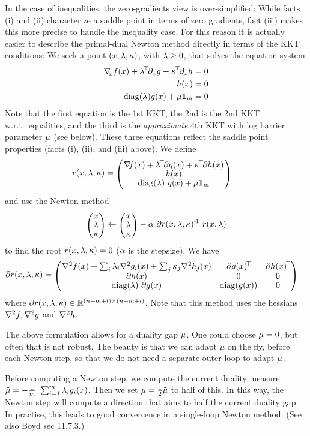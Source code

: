 In the case of inequalities, the zero-gradients view is over-simplified: While facts (i) and (ii) characterize a saddle point
in terms of zero gradients, fact (iii) makes this more precise to
handle the inequality case. For this reason it is actually easier to
describe the primal-dual Newton method directly in terms of the KKT
conditions: We seek a point $(x,\lambda,\kappa)$, with $\lambda\ge0$, that solves the equation system
\begin{align}
  {\nabla_{\!\!}}_x f(x) + \lambda^{\!\top\!} \partial_x g + \kappa^{\!\top\!} \partial_x h &= 0 \\
  h(x) &= 0 \\
  {\rm diag}(\lambda) g(x) + \mu {{\bf 1}}_m &=0
\end{align}
Note that the first equation is the 1st KKT, the 2nd is the 2nd KKT w.r.t.\ equalities, and the third is
the \emph{approximate} 4th KKT with log barrier parameter $\mu$ (see below). These
three equations reflect the saddle point properties (facts (i), (ii),
and (iii) above). We define
\begin{align}
r(x,\l,\k)
&= \mat{c}{
  \na f(x) + \l^\T \del g(x) + \k^\T \del h(x) \\
  h(x) \\
  \diag(\l)~ g(x) + \m \one_m}
\end{align}
and use the Newton method
\begin{equation}
\mat{c}{x\\\l\\\k}
 \gets \mat{c}{x\\\l\\\k} - \a~ \del r(x,\l,\k)^\1~ r(x,\l)
\end{equation}
to find the root $r(x,\lambda,\kappa)=0$ ($\alpha$ is the stepsize). We have
\begin{align}
\del r(x,\l,\k)
 &= \mat{ccc}{
  \he f(x) + \Sum_i \l_i \he g_i(x) + \Sum_j \k_j \he h_j(x) & \del g(x)^\T & \del h(x)^\T \\
  \del h(x) & 0 & 0 \\
  \diag(\l)~ \del g(x) & \diag(g(x)) & 0 
}
\end{align}
where $\partial r(x,\lambda,\kappa) \in {\mathbb{R}}^{(n+m+l)\times(n+m+l)}$.
Note that this method uses the hessians ${\nabla_{\!\!}^2} f, {\nabla_{\!\!}^2} g$ and ${\nabla_{\!\!}^2} h$.

The above formulation allows for a duality gap $\mu$. One could choose
$\mu=0$, but often that is not robust. The beauty is that we can adapt
$\mu$ on the fly, before each Newton step, so that we do not need a
separate outer loop to adapt $\mu$.

Before computing a Newton step, we compute the current duality measure\\
$\tilde \mu = -\frac{1}{m}~ \sum_{i=1}^m \lambda_i g_i(x)$. Then we set
$\mu = \frac{1}{2} \tilde \mu$ to half of this. In this way, the Newton step
will compute a direction that aims to half the current duality gap. In
practise, this leads to good convercence in a single-loop Newton
method. (See also Boyd sec 11.7.3.)

